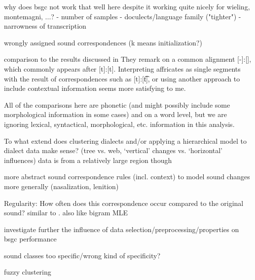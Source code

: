 \documentclass[a4paper]{article}
\begin{document}
why does bsgc not work that well here despite it working quite nicely for wieling, montemagni, ...?
- number of samples
- doculects/language family ("tighter")
- narrowness of transcription

wrongly assigned sound correspondences (k means initialization?)

comparison to the results discussed in \citet{wieling2011bipartite}
They remark on a common alignment [-]:[\textesh], which commonly appears after [t]:[t]. Interpreting affricates as single segments with the result of correspondences such as [t]:[\t{t\textesh}], or using another approach to include contextual information seems more satisfying to me.


All of the comparisons here are phonetic (and might possibly include some morphological information in some cases) and on a word level, but we are ignoring lexical, syntactical, morphological, etc. information in this analysis.

To what extend does clustering dialects and/or applying a hierarchical model to dialect data make sense? (tree vs. web, `vertical' changes vs. `horizontal' influences)
data is from a relatively large region though

more abstract sound correspondence rules (incl. context) to model sound changes more generally (nasalization, lenition)

Regularity: How often does this correspondence occur compared to the original sound? similar to \citet{prokic2013combining}. also like bigram MLE

investigate further the influence of data selection/preprocessing/properties on bsgc performance

sound classes too specific/wrong kind of specificity?

fuzzy clustering



\end{document}
